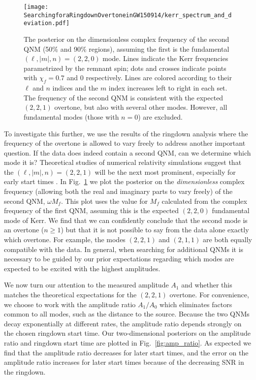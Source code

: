 \begin{figure}
    \centering
    \texttt{[image: SearchingforaRingdownOvertoneinGW150914/kerr\_spectrum\_and\_deviation.pdf]}
    \caption[Posterior on the dimensionless complex frequency of the second GW150914 QNM assuming the first is the fundamental mode]{ 
    The posterior on the dimensionless complex frequency of the second QNM (50\% and 90\% regions), assuming the first is the fundamental $(\ell,|m|,n)=(2,2,0)$ mode.
    Lines indicate the Kerr frequencies parametrized by the remnant spin; dots and crosses indicate points with $\chi_f=0.7$ and $0$ respectively.
    Lines are colored according to their $\ell$ and $n$ indices and the $m$ index increases left to right in each set.
    The frequency of the second QNM is consistent with the expected $(2,2,1)$ overtone, but also with several other modes.
    However, all fundamental modes (those with $n=0$) are excluded.
    }
    \label{fig:other_QNMs}
\end{figure}

To investigate this further, we use the results of the ringdown analysis where the frequency of the overtone is allowed to vary freely to address another important question. 
If the data does indeed contain a second QNM, can we determine which mode it is?
Theoretical studies of numerical relativity simulations suggest that the $(\ell,|m|,n)=(2,2,1)$ will be the next most prominent, especially for early start times \cite{Giesler:2019uxc}. 
In Fig.~\ref{fig:other_QNMs} we plot the posterior on the \emph{dimensionless} complex frequency (allowing both the real and imaginary parts to vary freely) of the second QNM, $\omega M_f$.
This plot uses the value for $M_f$ calculated from the complex frequency of the first QNM, assuming this is the expected $(2,2,0)$ fundamental mode of Kerr.
We find that we can confidently conclude that the second mode is an overtone ($n\geq 1$) but that it is not possible to say from the data alone exactly which overtone. 
For example, the modes $(2,2,1)$ and $(2,1,1)$ are both equally compatible with the data. 
In general, when searching for additional QNMs it is necessary to be guided by our prior expectations regarding which modes are expected to be excited with the highest amplitudes.

We now turn our attention to the measured amplitude $A_1$ and whether this matches the theoretical expectations for the $(2,2,1)$ overtone. 
For convenience, we choose to work with the amplitude ratio $A_1/A_0$ which eliminates factors common to all modes, such as the distance to the source. 
Because the two QNMs decay exponentially at different rates, the amplitude ratio depends strongly on the chosen ringdown start time.
Our two-dimensional posteriors on the amplitude ratio and ringdown start time are plotted in Fig.~\ref{fig:amp_ratio}.
As expected we find that the amplitude ratio decreases for later start times, and the error on the amplitude ratio increases for later start times because of the decreasing SNR in the ringdown.

